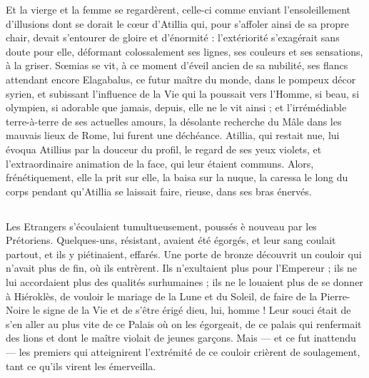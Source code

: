\documentclass[a4paper, 11pt, oneside, polutonikogreek, french]{article}
\begin{document}
Et la vierge et la femme se regardèrent, celle-ci comme enviant l'ensoleillement d'illusions dont se dorait le cœur d'Atillia qui, pour s'affoler ainsi de sa propre chair, devait s'entourer de gloire et d'énormité : l'extériorité s'exagérait sans doute pour elle, déformant colossalement ses lignes, ses couleurs et ses sensations, à la griser. Sœmias se vit, à ce moment d'éveil ancien de sa nubilité, ses flancs attendant encore Elagabalus, ce futur maître du monde, dans le pompeux décor syrien, et subissant l'influence de la Vie qui la poussait vers l'Homme, si beau, si olympien, si adorable que jamais, depuis, elle ne le vit ainsi ; et l'irrémédiable terre-à-terre de ses actuelles amours, la désolante recherche du Mâle dans les mauvais lieux de Rome, lui furent une déchéance. Atillia, qui restait nue, lui évoqua Atillius par la douceur du profil, le regard de ses yeux violets, et l'extraordinaire animation de la face, qui leur étaient communs. Alors, frénétiquement, elle la prit sur elle, la baisa sur la nuque, la caressa le long du corps pendant qu'Atillia se laissait faire, rieuse, dans ses bras énervés.
\clearpage
\subsection{}
\paragraph{}
Les Etrangers s'écoulaient tumultueusement, poussés è nouveau par les Prétoriens. Quelques-uns, résistant, avaient été égorgés, et leur sang coulait partout, et ils y piétinaient, effarés. Une porte de bronze découvrit un couloir qui n'avait plus de fin, où ils entrèrent. Ils n'exultaient plus pour l'Empereur ; ils ne lui accordaient plus des qualités surhumaines ; ils ne le louaient plus de se donner à Hiéroklès, de vouloir le mariage de la Lune et du Soleil, de faire de la Pierre-Noire le signe de la Vie et de s'être érigé dieu, lui, homme ! Leur souci était de s'en aller au plus vite de ce Palais où on les égorgeait, de ce palais qui renfermait des lions et dont le maître violait de jeunes garçons. Mais --- et ce fut inattendu --- les premiers qui atteignirent l'extrémité de ce couloir crièrent de soulagement, tant ce qu'ils virent les émerveilla.
\end{document}
